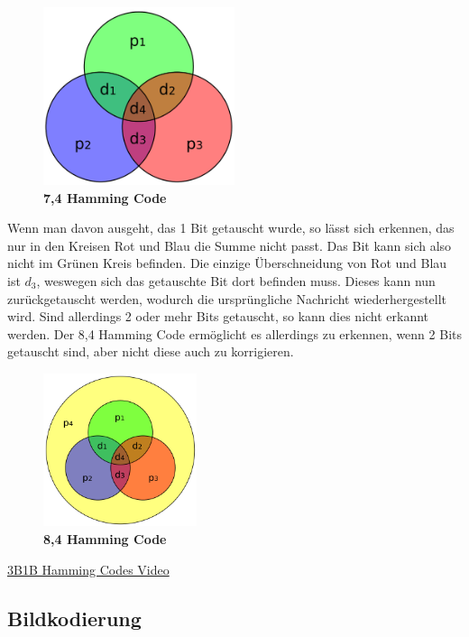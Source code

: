 \vspace*{-1cm}

\begin{figure}[H]
    \centering
    \includegraphics[width=0.5\textwidth]{images/hamming7.4.png}
    \caption{\textbf{7,4 Hamming Code}}
\end{figure}

Wenn man davon ausgeht, das 1 Bit getauscht wurde, so lässt sich erkennen,
das nur in den Kreisen Rot und Blau die Summe nicht passt. Das Bit kann
sich also nicht im Grünen Kreis befinden. Die einzige Überschneidung
von Rot und Blau ist $d_3$, weswegen sich das getauschte Bit dort befinden
muss. Dieses kann nun zurückgetauscht werden, wodurch die ursprüngliche Nachricht
wiederhergestellt wird. Sind allerdings 2 oder mehr Bits getauscht, so kann dies
nicht erkannt werden. Der 8,4 Hamming Code ermöglicht es allerdings zu erkennen, wenn
2 Bits getauscht sind, aber nicht diese auch zu korrigieren.

\begin{figure}[H]
    \centering
    \includegraphics[width=0.4\textwidth]{images/hamming8.4.png}
    \caption{\textbf{8,4 Hamming Code}}
\end{figure}

\href{https://www.youtube.com/watch?v=X8jsijhllIA}{3B1B Hamming Codes Video}

\subsection{Bildkodierung}

